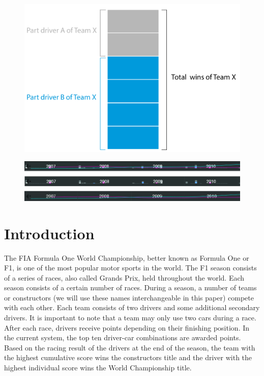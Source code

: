 \documentclass{sigchi}
\begin{document}
\begin{figure}
\begin{center}
\includegraphics[width=\columnwidth]{images/stackedbar.pdf}
\caption{}
\end{center}
\end{figure}


\begin{figure}
\begin{center}
\includegraphics[width=\columnwidth]{images/navigators.jpg}
\caption{}
\end{center}
\end{figure}

\section{Introduction}
The FIA Formula One World Championship, better known as Formula One or F1, is one of the most popular motor sports in the world. The F1 season consists of a series of races, also called Grands Prix, held throughout the world. Each season consists of a certain number of races. During a season, a number of teams or constructors (we will use these names interchangeable in this paper) compete with each other. Each team consists of two drivers and some additional secondary drivers. It is important to note that a team may only use two cars during a race. After each race, drivers receive points depending on their finishing position. In the current system, the top ten driver-car combinations are awarded points. Based on the racing result of the drivers at the end of the season, the team with the highest cumulative score wins the constructors title and the driver with the highest individual score wins the World Championship title.
 
\end{document}

